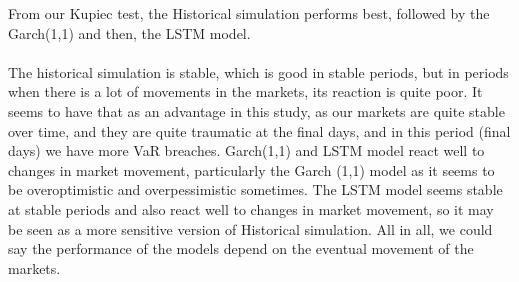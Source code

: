 \documentclass[a4paper,11pt,oneside]{book}
\begin{document}
From our Kupiec test, the Historical simulation performs best, followed by the Garch(1,1) and then, the LSTM model.\\\\  The historical simulation is stable, which is good in stable periods, but in periods when there is a lot of movements in the markets, its reaction is quite poor. It seems to have that as an advantage in this study, as our markets are quite stable over time, and they are quite traumatic at the final days, and in this period (final days) we have more VaR breaches.  Garch(1,1) and LSTM model react well to changes in market movement, particularly the Garch (1,1) model as it seems to be overoptimistic and overpessimistic sometimes. The LSTM model seems stable at stable periods and also react well to changes in market movement, so it may be seen as a more sensitive version of Historical simulation. All in all, we could say the performance of the models depend on the eventual movement of the markets.











	



	
	
	






	

	


\end{document}
